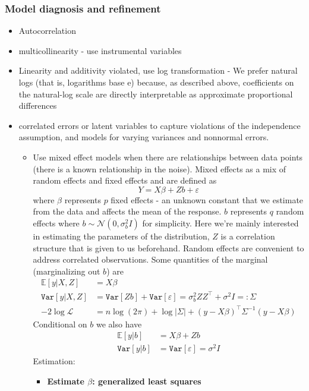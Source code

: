 \documentclass{article}
\begin{document}
\subsubsection{Model diagnosis and refinement}
\begin{itemize}
  \item Autocorrelation
  \item multicollinearity - use instrumental variables
  \item Linearity and additivity violated, use log transformation - We prefer natural logs (that is, logarithms base e) because, as described above, coefficients on the natural-log scale are directly interpretable as approximate proportional differences
  \item correlated errors or latent variables to capture violations of the independence assumption, and models for varying variances and nonnormal errors.
    \begin{itemize}
      \item Use mixed effect models when there are relationships between data points (there is a known relationship in the noise). Mixed effects as a
        mix of random effects and fixed effects and are defined as
        \[ Y = X\beta + Zb + \varepsilon \]
        where $\beta$ represents $p$ fixed effects - an unknown constant that we estimate from the data and affects the mean of the response.
        $b$ represents $q$ random effects where $b \sim \mathcal{N}(0, \sigma^2_b I)$ for simplicity. Here we're mainly
        interested in estimating the parameters of the distribution, $Z$ is a correlation structure that is given to us beforehand. Random effects are convenient to address correlated observations.
        Some quantities of the marginal (marginalizing out $b$) are
        \begin{align*}
          \mathbb{E}[y | X, Z] &= X\beta\\
          \mathtt{Var}[y | X, Z] &= \mathtt{Var}[Zb] + \mathtt{Var}[\varepsilon] = \sigma^2_b Z Z^\top + \sigma^2 I =: \Sigma \\
          -2 \log \mathcal{L} &= n \log(2\pi) + \log |\Sigma| + (y - X \beta)^\top \Sigma^{-1} (y - X\beta)
        \end{align*}
        Conditional on $b$ we also have
        \begin{align*}
          \mathbb{E}[y | b] &= X \beta + Zb\\
          \mathtt{Var}[y | b] &= \mathtt{Var}[\varepsilon] = \sigma^2 I
        \end{align*}
        Estimation:
        \begin{itemize}
          \item \textbf{Estimate $\beta$: generalized least squares}


\end{itemize}
\end{itemize}
\end{itemize}
\end{document}
